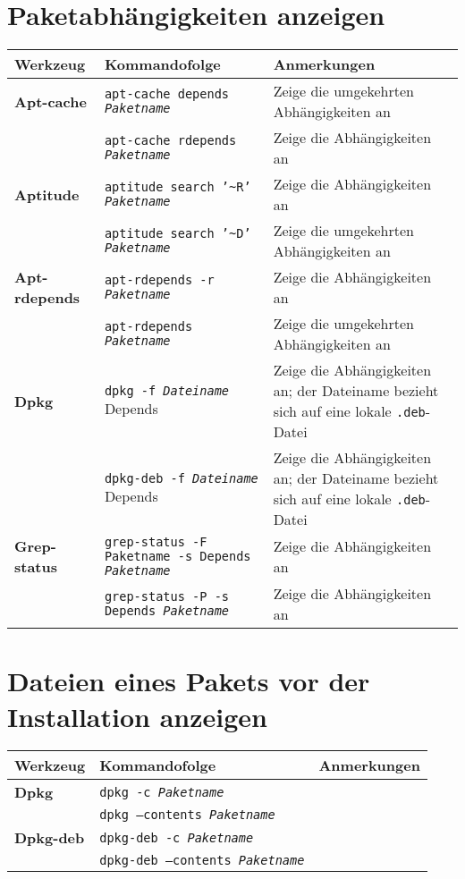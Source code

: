 \documentclass[10pt]{article}
\begin{document}
\section{Paketabhängigkeiten anzeigen}
\begin{tabular}{ p{3.5cm} p{9cm} p{11cm}}
  \hline
  \rowcolor{Gray}
  \textbf{Werkzeug} & \textbf{Kommandofolge} & \textbf{Anmerkungen} \\
  \hline 
  \textbf{Apt-cache} & \texttt{apt-cache depends \textit{Paketname}} & Zeige die umgekehrten Abhängigkeiten an \\
  \rowcolor{Gray}
  & \texttt{apt-cache rdepends \textit{Paketname}} & Zeige die Abhängigkeiten an \\
  \textbf{Aptitude} & \texttt{aptitude search '\textasciitilde{R}' \textit{Paketname}} & Zeige die Abhängigkeiten an \\
  \rowcolor{Gray}
  & \texttt{aptitude search '\textasciitilde{D}' \textit{Paketname}} & Zeige die umgekehrten Abhängigkeiten an\\
  \textbf{Apt-rdepends} & \texttt{apt-rdepends -r \textit{Paketname}} & Zeige die Abhängigkeiten an \\
  \rowcolor{Gray}
  & \texttt{apt-rdepends \textit{Paketname}} & Zeige die umgekehrten Abhängigkeiten an \\
  \textbf{Dpkg} & \texttt{dpkg -f \textit{Dateiname}} Depends & Zeige die Abhängigkeiten an; der Dateiname bezieht sich auf eine lokale \texttt{.deb}-Datei \\
  \rowcolor{Gray}
  & \texttt{dpkg-deb -f \textit{Dateiname}} Depends & Zeige die Abhängigkeiten an; der Dateiname bezieht sich auf eine lokale \texttt{.deb}-Datei \\
  \textbf{Grep-status} & \texttt{grep-status -F Paketname -s Depends \textit{Paketname}} & Zeige die Abhängigkeiten an \\
  \rowcolor{Gray}
  & \texttt{grep-status -P -s Depends \textit{Paketname}} & Zeige die Abhängigkeiten an \\
  \hline
\end{tabular}

\newpage

\cheatsheet

\section{Dateien eines Pakets vor der Installation anzeigen}
\begin{tabular}{ p{3.5cm} p{9cm} p{11cm}}
  \hline
  \rowcolor{Gray}
  \textbf{Werkzeug} & \textbf{Kommandofolge} & \textbf{Anmerkungen} \\
  \hline 
  \textbf{Dpkg} & \texttt{dpkg -c \textit{Paketname}} & \\
  \rowcolor{Gray}
  & \texttt{dpkg --contents \textit{Paketname}} & \\
  \textbf{Dpkg-deb} & \texttt{dpkg-deb -c \textit{Paketname}} & \\
  \rowcolor{Gray}
  & \texttt{dpkg-deb --contents \textit{Paketname}} & \\
  \hline
\end{tabular}
\end{document}
